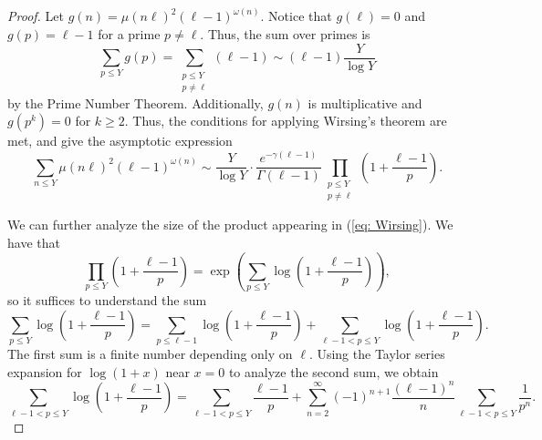 \documentclass[12pt]{amsart}
\begin{document}
\begin{proof}

Let $g(n) = \mu(n\ell)^2(\ell-1)^{\omega(n)}$. Notice that $g(\ell) = 0$ and $g(p) = \ell-1$ for a prime $p \neq \ell$. Thus, the sum over primes is
\[ \sum_{p \leq Y} g(p) = \sum_{\substack{p \leq Y\\ p \neq \ell}} (\ell-1) \sim (\ell-1)\frac{Y}{\log Y} \] by the Prime Number Theorem. Additionally, $g(n)$ is multiplicative and $g(p^k) = 0$ for $k \geq 2$. Thus, the conditions for applying Wirsing's theorem \cite[Satz 1]{Wirsing} are met, and give the asymptotic expression
\begin{equation} \label{eq: Wirsing}
    \sum_{n\leq Y}\mu(n\ell)^2(\ell-1)^{\omega(n)}\sim
\frac{Y}{\log Y}\cdot\frac{e^{-\gamma(\ell-1)}}{\Gamma(\ell-1)}
\prod_{\substack{p\leq Y\\p\neq \ell}}\left(1+\frac{\ell-1}{p}\right).
\end{equation}


We can further analyze the size of the product  appearing in (\ref{eq: Wirsing}). We have that 
        \[ \prod_{p \leq Y} \left( 1 + \frac{\ell-1}{p}\right) = \exp\left({ \sum_{p \leq Y} \log\left(1 + \frac{\ell-1}{p}\right)}\right),\] so it suffices to understand the sum
        \[\sum_{p \leq Y} \log\left(1 + \frac{\ell-1}{p} \right) = \sum_{p \leq \ell-1} \log\left(1 + \frac{\ell-1}{p} \right) +\sum_{\ell-1 < p \leq Y} \log\left(1 + \frac{\ell-1}{p} \right).\] The first sum is a finite number depending only on $\ell$.
        Using the Taylor series expansion for $\log(1 + x)$ near $x = 0$ to analyze the second sum, we obtain 
        \[ \sum_{\ell-1 < p \leq Y} \log\left(1 + \frac{\ell-1}{p}\right) = \sum_{\ell-1 < p \leq Y} \frac{\ell-1}{p} + \sum_{n=2}^\infty (-1)^{n+1} \frac{(\ell-1)^n}{n}\sum_{\ell-1 < p \leq Y} \frac{1}{p^n}.\]
        

\end{proof}
\end{document}
